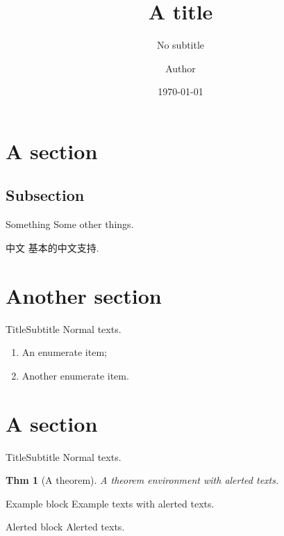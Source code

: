 \documentclass[english]{pkuslide}
\title{A title}
\subtitle{No subtitle}
\institute{Peking University}
\author{Author}
\date{\today}
\newtheorem{Thm}{Thm}
\begin{document}
	\begin{frame}
\titlepage
	\end{frame}

	\begin{frame}
\tableofcontents[subsectionstyle=show]
	\end{frame}

\section{A section}

\subsection{Subsection}

	\begin{frame}{Something}
\centering
Some other things.
	\end{frame}

	\begin{frame}{中文}
基本的中文支持.
	\end{frame}

\section{Another section}

	\frame{\sectionpage}

	\begin{frame}{Title}{Subtitle}
Normal texts.
\begin{enumerate}
\item An enumerate item;
\item Another enumerate item.
\end{enumerate}
	\end{frame}

\section{A section}

	\frame{\sectionpage}

	\begin{frame}{Title}{Subtitle}
Normal texts.
\begin{Thm}[A theorem]
A theorem environment with \alert{alerted} texts.
\end{Thm}
\begin{exampleblock}{Example block}
Example texts with \alert{alerted} texts.
\end{exampleblock}
\begin{alertblock}{Alerted block}
Alerted texts.
\end{alertblock}
	\end{frame}
\end{document}
